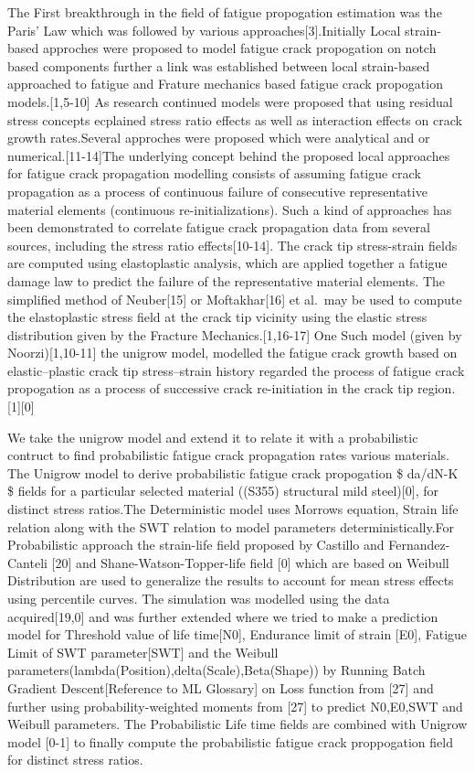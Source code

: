 \documentclass[11pt]{article}
\begin{document}
The First breakthrough in the field of fatigue propogation estimation
was the Paris' Law which was followed by various
approaches{[}3{]}.Initially Local strain-based approches were proposed
to model fatigue crack propogation on notch based components further a
link was established between local strain-based approached to fatigue
and Frature mechanics based fatigue crack propogation
models.{[}1,5-10{]} As research continued models were proposed that
using residual stress concepts ecplained stress ratio effects as well as
interaction effects on crack growth rates.Several approches were
proposed which were analytical and or numerical.{[}11-14{]}The
underlying concept behind the proposed local approaches for fatigue
crack propagation modelling consists of assuming fatigue crack
propagation as a process of continuous failure of consecutive
representative material elements (continuous re-initializations). Such a
kind of approaches has been demonstrated to correlate fatigue crack
propagation data from several sources, including the stress ratio
effects{[}10-14{]}. The crack tip stress-strain fields are computed
using elastoplastic analysis, which are applied together a fatigue
damage law to predict the failure of the representative material
elements. The simplified method of Neuber{[}15{]} or Moftakhar{[}16{]}
et al.~may be used to compute the elastoplastic stress field at the
crack tip vicinity using the elastic stress distribution given by the
Fracture Mechanics.{[}1,16-17{]} One Such model (given by
Noorzi){[}1,10-11{]} the unigrow model, modelled the fatigue crack
growth based on elastic--plastic crack tip stress--strain history
regarded the process of fatigue crack propogation as a process of
successive crack re-initiation in the crack tip region. {[}1{]}{[}0{]}

We take the unigrow model and extend it to relate it with a
probabilistic contruct to find probabilistic fatigue crack propagation
rates various materials. The Unigrow model to derive probabilistic
fatigue crack propogation \$ da/dN-\bigtriangleup K \$ fields for a
particular selected material ((S355) structural mild steel){[}0{]}, for
distinct stress ratios.The Deterministic model uses Morrows equation,
Strain life relation along with the SWT relation to model parameters
deterministically.For Probabilistic approach the strain-life field
proposed by Castillo and Fernandez-Canteli {[}20{]} and
Shane-Watson-Topper-life field {[}0{]} which are based on Weibull
Distribution are used to generalize the results to account for mean
stress effects using percentile curves. The simulation was modelled
using the data acquired{[}19,0{]} and was further extended where we
tried to make a prediction model for Threshold value of life
time{[}N0{]}, Endurance limit of strain {[}E0{]}, Fatigue Limit of SWT
parameter{[}SWT{]} and the Weibull
parameters(lambda(Position),delta(Scale),Beta(Shape)) by Running Batch
Gradient Descent{[}Reference to ML Glossary{]} on Loss function from
{[}27{]} and further using probability-weighted moments from {[}27{]} to
predict N0,E0,SWT and Weibull parameters. The Probabilistic Life time
fields are combined with Unigrow model {[}0-1{]} to finally compute the
probabilistic fatigue crack proppogation field for distinct stress
ratios.
\end{document}
